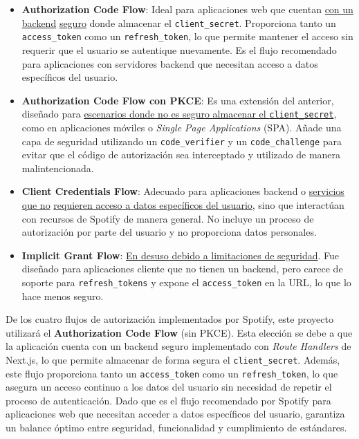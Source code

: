 \begin{itemize}
    \item \textbf{Authorization Code Flow}: Ideal para aplicaciones web que cuentan \underline{con un backend} \underline{seguro} donde almacenar el \texttt{client\_secret}. Proporciona tanto un \texttt{access\_token} como un \texttt{refresh\_token}, lo que permite mantener el acceso sin requerir que el usuario se autentique nuevamente. Es el flujo recomendado para aplicaciones con servidores backend que necesitan acceso a datos específicos del usuario.

    \item \textbf{Authorization Code Flow con PKCE}: Es una extensión del anterior, diseñado para \underline{escenarios donde no es seguro almacenar el \texttt{client\_secret}}, como en aplicaciones móviles o \textit{Single Page Applications} (SPA). Añade una capa de seguridad utilizando un \texttt{code\_verifier} y un \texttt{code\_challenge} para evitar que el código de autorización sea interceptado y utilizado de manera malintencionada.

    \item \textbf{Client Credentials Flow}: Adecuado para aplicaciones backend o \underline{servicios que no} \underline{requieren acceso a datos específicos del usuario}, sino que interactúan con recursos de Spotify de manera general. No incluye un proceso de autorización por parte del usuario y no proporciona datos personales.

    \item \textbf{Implicit Grant Flow}: \underline{En desuso debido a limitaciones de seguridad}. Fue diseñado para aplicaciones cliente que no tienen un backend, pero carece de soporte para \texttt{refresh\_tokens} y expone el \texttt{access\_token} en la URL, lo que lo hace menos seguro.
\end{itemize}

De los cuatro flujos de autorización implementados por Spotify, este proyecto utilizará el \textbf{Authorization Code Flow} (sin PKCE). Esta elección se debe a que la aplicación cuenta con un backend seguro implementado con \textit{Route Handlers} de Next.js, lo que permite almacenar de forma segura el \texttt{client\_secret}. Además, este flujo proporciona tanto un \texttt{access\_token} como un \texttt{refresh\_token}, lo que asegura un acceso continuo a los datos del usuario sin necesidad de repetir el proceso de autenticación. Dado que es el flujo recomendado por Spotify para aplicaciones web que necesitan acceder a datos específicos del usuario, garantiza un balance óptimo entre seguridad, funcionalidad y cumplimiento de estándares.

